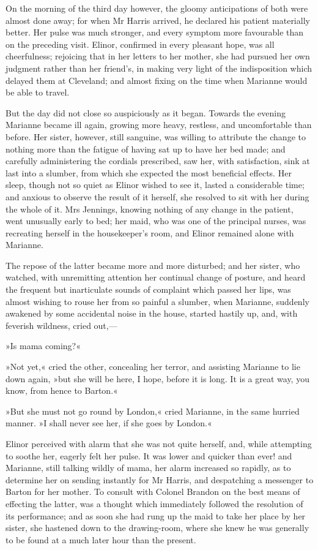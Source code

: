 On the morning of the third day however, the gloomy anticipations of both were almost done away; for when Mr Harris arrived, he declared his patient materially better. Her pulse was much stronger, and every symptom more favourable than on the preceding visit. Elinor, confirmed in every pleasant hope, was all cheerfulness; rejoicing that in her letters to her mother, she had pursued her own judgment rather than her friend’s, in making very light of the indisposition which delayed them at Cleveland; and almost fixing on the time when Marianne would be able to travel.

But the day did not close so auspiciously as it began. Towards the evening Marianne became ill again, growing more heavy, restless, and uncomfortable than before. Her sister, however, still sanguine, was willing to attribute the change to nothing more than the fatigue of having sat up to have her bed made; and carefully administering the cordials prescribed, saw her, with satisfaction, sink at last into a slumber, from which she expected the most beneficial effects. Her sleep, though not so quiet as Elinor wished to see it, lasted a considerable time; and anxious to observe the result of it herself, she resolved to sit with her during the whole of it. Mrs Jennings, knowing nothing of any change in the patient, went unusually early to bed; her maid, who was one of the principal nurses, was recreating herself in the housekeeper’s room, and Elinor remained alone with Marianne.

The repose of the latter became more and more disturbed; and her sister, who watched, with unremitting attention her continual change of posture, and heard the frequent but inarticulate sounds of complaint which passed her lips, was almost wishing to rouse her from so painful a slumber, when Marianne, suddenly awakened by some accidental noise in the house, started hastily up, and, with feverish wildness, cried out,—

»Is mama coming?«

»Not yet,« cried the other, concealing her terror, and assisting Marianne to lie down again, »but she will be here, I hope, before it is long. It is a great way, you know, from hence to Barton.«

»But she must not go round by London,« cried Marianne, in the same hurried manner. »I shall never see her, if she goes by London.«

Elinor perceived with alarm that she was not quite herself, and, while attempting to soothe her, eagerly felt her pulse. It was lower and quicker than ever! and Marianne, still talking wildly of mama, her alarm increased so rapidly, as to determine her on sending instantly for Mr Harris, and despatching a messenger to Barton for her mother. To consult with Colonel Brandon on the best means of effecting the latter, was a thought which immediately followed the resolution of its performance; and as soon she had rung up the maid to take her place by her sister, she hastened down to the drawing-room, where she knew he was generally to be found at a much later hour than the present.

